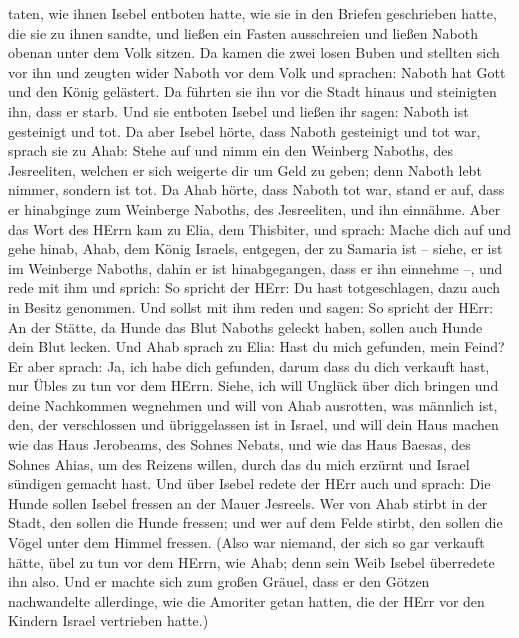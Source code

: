 taten, wie ihnen Isebel entboten hatte, wie sie in den Briefen
geschrieben hatte, die sie zu ihnen sandte,  und ließen ein
Fasten ausschreien und ließen Naboth obenan unter dem Volk sitzen.
 Da kamen die zwei losen Buben und stellten sich vor ihn
und zeugten wider Naboth vor dem Volk und sprachen: Naboth hat Gott und
den König gelästert. Da führten sie ihn vor die Stadt hinaus und
steinigten ihn, dass er starb.  Und sie entboten Isebel und
ließen ihr sagen: Naboth ist gesteinigt und tot.  Da aber
Isebel hörte, dass Naboth gesteinigt und tot war, sprach sie zu Ahab:
Stehe auf und nimm ein den Weinberg Naboths, des Jesreeliten, welchen er
sich weigerte dir um Geld zu geben; denn Naboth lebt nimmer, sondern ist
tot.  Da Ahab hörte, dass Naboth tot war, stand er auf,
dass er hinabginge zum Weinberge Naboths, des Jesreeliten, und ihn
einnähme.  Aber das Wort des HErrn kam zu Elia, dem
Thisbiter, und sprach:  Mache dich auf und gehe hinab,
Ahab, dem König Israels, entgegen, der zu Samaria ist -- siehe, er ist
im Weinberge Naboths, dahin er ist hinabgegangen, dass er ihn einnehme
--,  und rede mit ihm und sprich: So spricht der HErr: Du
hast totgeschlagen, dazu auch in Besitz genommen. Und sollst mit ihm
reden und sagen: So spricht der HErr: An der Stätte, da Hunde das Blut
Naboths geleckt haben, sollen auch Hunde dein Blut lecken. 
Und Ahab sprach zu Elia: Hast du mich gefunden, mein Feind? Er aber
sprach: Ja, ich habe dich gefunden, darum dass du dich verkauft hast,
nur Übles zu tun vor dem HErrn.  Siehe, ich will Unglück
über dich bringen und deine Nachkommen wegnehmen und will von Ahab
ausrotten, was männlich ist, den, der verschlossen und übriggelassen ist
in Israel,  und will dein Haus machen wie das Haus
Jerobeams, des Sohnes Nebats, und wie das Haus Baesas, des Sohnes Ahias,
um des Reizens willen, durch das du mich erzürnt und Israel sündigen
gemacht hast.  Und über Isebel redete der HErr auch und
sprach: Die Hunde sollen Isebel fressen an der Mauer Jesreels.
 Wer von Ahab stirbt in der Stadt, den sollen die Hunde
fressen; und wer auf dem Felde stirbt, den sollen die Vögel unter dem
Himmel fressen.  (Also war niemand, der sich so gar
verkauft hätte, übel zu tun vor dem HErrn, wie Ahab; denn sein Weib
Isebel überredete ihn also.  Und er machte sich zum großen
Gräuel, dass er den Götzen nachwandelte allerdinge, wie die Amoriter
getan hatten, die der HErr vor den Kindern Israel vertrieben hatte.)
